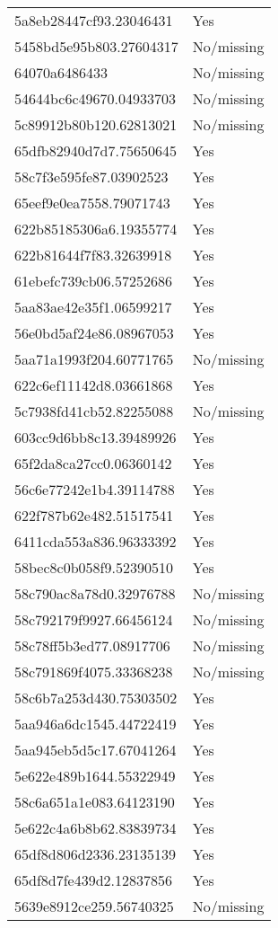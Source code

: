 \begin{tabular}{ll}
5a8eb28447cf93.23046431 & Yes \\
5458bd5e95b803.27604317 & No/missing \\
64070a6486433 & No/missing \\
54644bc6c49670.04933703 & No/missing \\
5c89912b80b120.62813021 & No/missing \\
65dfb82940d7d7.75650645 & Yes \\
58c7f3e595fe87.03902523 & Yes \\
65eef9e0ea7558.79071743 & Yes \\
622b85185306a6.19355774 & Yes \\
622b81644f7f83.32639918 & Yes \\
61ebefc739cb06.57252686 & Yes \\
5aa83ae42e35f1.06599217 & Yes \\
56e0bd5af24e86.08967053 & Yes \\
5aa71a1993f204.60771765 & No/missing \\
622c6ef11142d8.03661868 & Yes \\
5c7938fd41cb52.82255088 & No/missing \\
603cc9d6bb8c13.39489926 & Yes \\
65f2da8ca27cc0.06360142 & Yes \\
56c6e77242e1b4.39114788 & Yes \\
622f787b62e482.51517541 & Yes \\
6411cda553a836.96333392 & Yes \\
58bec8c0b058f9.52390510 & Yes \\
58c790ac8a78d0.32976788 & No/missing \\
58c792179f9927.66456124 & No/missing \\
58c78ff5b3ed77.08917706 & No/missing \\
58c791869f4075.33368238 & No/missing \\
58c6b7a253d430.75303502 & Yes \\
5aa946a6dc1545.44722419 & Yes \\
5aa945eb5d5c17.67041264 & Yes \\
5e622e489b1644.55322949 & Yes \\
58c6a651a1e083.64123190 & Yes \\
5e622c4a6b8b62.83839734 & Yes \\
65df8d806d2336.23135139 & Yes \\
65df8d7fe439d2.12837856 & Yes \\
5639e8912ce259.56740325 & No/missing \\

\end{tabular}
